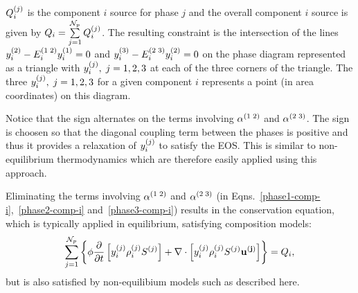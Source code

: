 $\mfr[Q]{i}{j}$ is the component $i$ source for phase $j$ and the overall component $i$ source is given by $Q_i=\summation_{j=1}^{{\cal N}_p} \mfr[Q]{i}{j}$.  The resulting constraint is the intersection of the lines $\mfr[y]{i}{2} - \mfr[E]{i}{1\;2} \mfr[y]{i}{1}=0$ and $\mfr[y]{i}{3} - \mfr[E]{i}{2\;3}\mfr[y]{i}{2}= 0$ on the phase diagram represented as a triangle with $\mfr[y]{i}{j}, \; j =1,2,3$ at each of the three corners of the triangle. The three $\mfr[y]{i}{j}, \; j =1,2,3$ for a given component $i$ represents a point (in area coordinates) on this diagram. 


Notice that the sign alternates on the terms involving $\mfr[\alpha]{}{1\;2}$ and $\mfr[\alpha]{}{2\;3}$. The sign is choosen so that the diagonal coupling term between the phases is positive and thus it provides a relaxation of $\mfr[y]{i}{j}$ to satisfy the EOS. This is similar to non-equilibrium thermodynamics which are therefore easily applied using this approach. 


Eliminating the terms involving $\mfr[\alpha]{}{1\;2}$ and $\mfr[\alpha]{}{2\;3}$ (in Eqns.~\ref{phase1-comp-i},~\ref{phase2-comp-i} and~\ref{phase3-comp-i}) results in the conservation equation, which is typically applied in equilibrium, satisfying composition models: 
\begin{equation}
    \summation_{j=1}^{\mathcal{N}_{p}} \left\{\phi \frc{\partial}{\partial t}\left[\mfr[y]{i}{j}\mfr[\rho]{i}{j}\mfr[S]{}{j} \right] + \nabla\cdot\left[\mfr[y]{i}{j}\mfr[\rho]{i}{j}\mfr[S]{}{j}\mathbf{\mfr[u]{}{j}} \right]  \right\} = Q_{i}, 
\end{equation}
but is also satisfied by non-equilibium models such as described here. 

